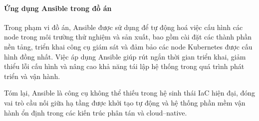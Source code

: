 \paragraph*{Ứng dụng Ansible trong đồ án}

Trong phạm vi đồ án, Ansible được sử dụng để tự động hoá việc cấu hình các node 
trong môi trường thử nghiệm và sản xuất, bao gồm cài đặt các thành phần nền tảng, 
triển khai công cụ giám sát và đảm bảo các node Kubernetes được cấu hình đồng nhất. 
Việc áp dụng Ansible giúp rút ngắn thời gian triển khai, giảm thiểu lỗi cấu hình 
và nâng cao khả năng tái lập hệ thống trong quá trình phát triển và vận hành.

Tóm lại, Ansible là công cụ không thể thiếu trong hệ sinh thái IaC hiện đại, 
đóng vai trò cầu nối giữa hạ tầng được khởi tạo tự động và hệ thống phần mềm 
vận hành ổn định trong các kiến trúc phân tán và cloud–native.




